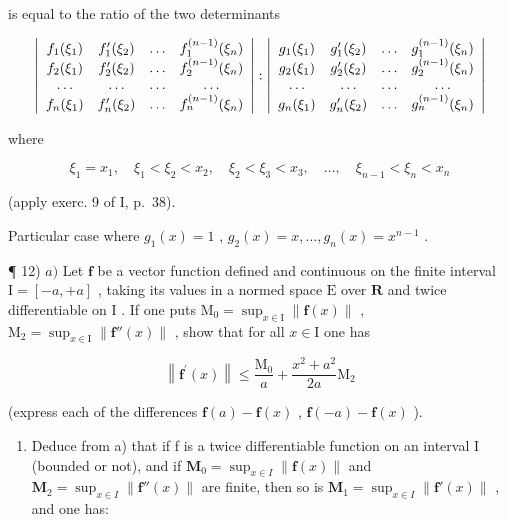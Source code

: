 is equal to the ratio of the two determinants

\[
\left| \begin{array}{c c c c} f _ {1} (\xi_ {1}) & f _ {1} ^ {\prime} (\xi_ {2}) & \dots & f _ {1} ^ {(n - 1)} (\xi_ {n}) \\ f _ {2} (\xi_ {1}) & f _ {2} ^ {\prime} (\xi_ {2}) & \dots & f _ {2} ^ {(n - 1)} (\xi_ {n}) \\ \dots & \dots & \dots & \dots \\ f _ {n} (\xi_ {1}) & f _ {n} ^ {\prime} (\xi_ {2}) & \dots & f _ {n} ^ {(n - 1)} (\xi_ {n}) \end{array} \right|: \left| \begin{array}{c c c c} g _ {1} (\xi_ {1}) & g _ {1} ^ {\prime} (\xi_ {2}) & \dots & g _ {1} ^ {(n - 1)} (\xi_ {n}) \\ g _ {2} (\xi_ {1}) & g _ {2} ^ {\prime} (\xi_ {2}) & \dots & g _ {2} ^ {(n - 1)} (\xi_ {n}) \\ \dots & \dots & \dots & \dots \\ g _ {n} (\xi_ {1}) & g _ {n} ^ {\prime} (\xi_ {2}) & \dots & g _ {n} ^ {(n - 1)} (\xi_ {n}) \end{array} \right|
\]

where

\[
\xi_ {1} = x _ {1}, \quad \xi_ {1} <   \xi_ {2} <   x _ {2}, \quad \xi_ {2} <   \xi_ {3} <   x _ {3}, \quad \dots , \quad \xi_ {n - 1} <   \xi_ {n} <   x _ {n}
\]

(apply exerc. 9 of I, p.~38).

Particular case where \(g_{1}(x)=1\) , \(g_{2}(x)=x,\ldots,g_{n}(x)=x^{n-1}\) .

¶ 12) \(a)\) Let \(\mathbf{f}\) be a vector function defined and continuous on the finite interval \(\mathrm{I} = [-a, + a]\) , taking its values in a normed space \(\mathrm{E}\) over \(\mathbf{R}\) and twice differentiable on \(\mathrm{I}\) . If one puts \(\mathrm{M}_0 = \sup_{x\in \mathrm{I}}\| \mathbf{f}(x)\|\) , \(\mathrm{M}_2 = \sup_{x\in \mathrm{I}}\| \mathbf{f}''(x)\|\) , show that for all \(x\in \mathrm{I}\) one has

\[
\left\| \mathbf {f} ^ {\prime} (x) \right\| \leqslant \frac {\mathrm{M} _ {0}}{a} + \frac {x ^ {2} + a ^ {2}}{2 a} \mathrm{M} _ {2}
\]

(express each of the differences \(\mathbf{f}(a) - \mathbf{f}(x)\) , \(\mathbf{f}(-a) - \mathbf{f}(x)\) ).

\begin{enumerate}
\def\labelenumi{\alph{enumi})}
\setcounter{enumi}{1}
\tightlist
\item
  Deduce from a) that if f is a twice differentiable function on an interval I (bounded or not), and if \(\mathbf{M}_{0} = \sup_{x \in I} \| \mathbf{f}(x) \|\) and \(\mathbf{M}_{2} = \sup_{x \in I} \| \mathbf{f}''(x) \|\) are finite, then so is \(\mathbf{M}_{1} = \sup_{x \in I} \| \mathbf{f}'(x) \|\) , and one has:
\end{enumerate}

